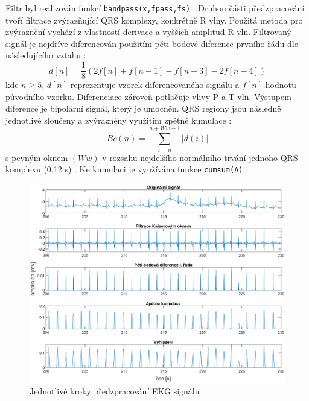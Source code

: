Filtr byl realizován funkcí \texttt{bandpass(x,fpass,fs)} \cite{matlabBANDPASS}.
Druhou části předzpracování tvoří filtrace zvýrazňující QRS komplexy, konkrétně
R vlny. Použitá metoda pro zvýraznění vychází z vlastností derivace a vyšších
amplitud R vln. Filtrovaný signál je nejdříve diferencován použitím pěti-bodové
diference prvního řádu dle následujícího vztahu \cite{Wang2017}:
\begin{equation}
    \label{eq:differentiation}
    d[n] = \frac{1}{8}(2f[n] + f[n-1] - f[n-3] - 2f[n-4])
\end{equation}
kde $n \geq 5$, $d[n]$ reprezentuje vzorek diferencovaného signálu a $f[n]$
hodnotu původního vzorku. Diferenciace zároveň potlačuje vlivy P a T vln.
Výstupem diference je bipolární signál, který je umocněn. QRS regiony jsou
následně jednotlivě sloučeny a zvýrazněny využitím zpětné kumulace
\cite{Wang2017}:
\begin{equation}
    \label{eq:backward_cumulation}
    Bc(n) = \sum_{i=n}^{n+Ww-1} |d(i)|
\end{equation}
s pevným oknem $(Ww)$ v rozsahu nejdelšího normálního trvání jednoho QRS
komplexu (0,12 s) \cite{Wang2017}. Ke kumulaci je využívána funkce
\texttt{cumsum(A)} \cite{matlabCUMSUM}.

\begin{figure}[h!]
    \begin{center}
        \includegraphics[width=1\textwidth]{../assets/figures/preprocessing_steps}
        \caption{Jednotlivé kroky předzpracování EKG signálu}
        \label{fig:preprocessing_steps}
    \end{center}
\end{figure}

